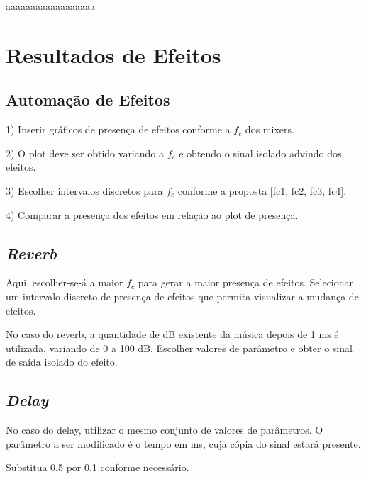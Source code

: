 aaaaaaaaaaaaaaaaaa
\newpage
\newpage
\section{Resultados de Efeitos}

\subsection{Automação de Efeitos}

1) Inserir gráficos de presença de efeitos conforme a $f_c$ dos mixers.

2) O plot deve ser obtido variando a $f_c$ e obtendo o sinal isolado advindo dos efeitos.

3) Escolher intervalos discretos para $f_c$ conforme a proposta [fc1, fc2, fc3, fc4].

4) Comparar a presença dos efeitos em relação ao plot de presença.

\subsection{\textit{Reverb}}

Aqui, escolher-se-á a maior $f_c$ para gerar a maior presença de efeitos. Selecionar um intervalo discreto de presença de efeitos que permita visualizar a mudança de efeitos.

No caso do reverb, a quantidade de dB existente da música depois de 1 ms é utilizada, variando de 0 a 100 dB. Escolher valores de parâmetro e obter o sinal de saída isolado do efeito.

\subsection{\textit{Delay}}

No caso do delay, utilizar o mesmo conjunto de valores de parâmetros. O parâmetro a ser modificado é o tempo em ms, cuja cópia do sinal estará presente.

Substitua 0.5 por 0.1 conforme necessário.
